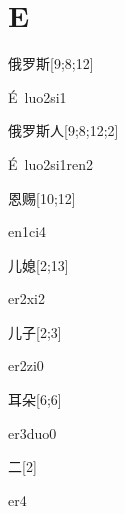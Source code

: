 ﻿%
\section*{E}

\begin{verbete}[É\ luo2si1]{俄罗斯}[9;8;12]
\begin{pronuncia}{É\ luo2si1}
\end{pronuncia}
\end{verbete}

\begin{verbete}{俄罗斯人}[9;8;12;2]
\begin{pronuncia}[\\]{É\ luo2si1ren2}
\end{pronuncia}
\end{verbete}

\begin{verbete}[en1ci4]{恩赐}[10;12]
\begin{pronuncia}{en1ci4}
\end{pronuncia}
\end{verbete}

\begin{verbete}[er2xi2]{儿媳}[2;13]
\begin{pronuncia}{er2xi2}
\end{pronuncia}
\end{verbete}

\begin{verbete}[er2zi0]{儿子}[2;3]
\begin{pronuncia}{er2zi0}
\end{pronuncia}
\end{verbete}

\begin{verbete}[er3duo0]{耳朵}[6;6]
\begin{pronuncia}{er3duo0}
\end{pronuncia}
\end{verbete}

\begin{verbete}[er4]{二}[2]
\begin{pronuncia}{er4}
\end{pronuncia}
\end{verbete}

